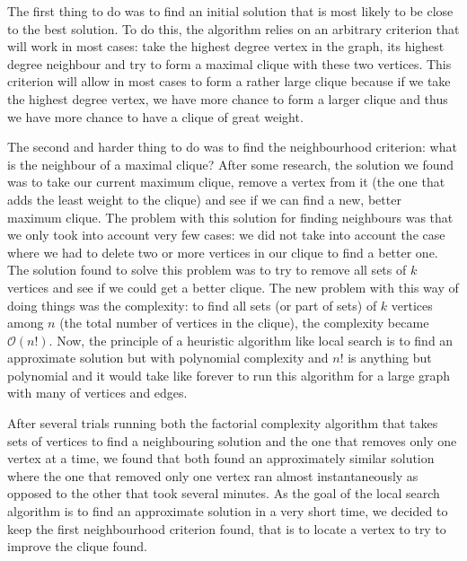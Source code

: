 The first thing to do was to find an initial solution that is most likely to be 
close to the best solution. To do this, the algorithm relies on an arbitrary 
criterion that will work in most cases: take the highest degree vertex in the 
graph, its highest degree neighbour and try to form a maximal clique with these 
two vertices. This criterion will allow in most cases to form a rather large 
clique because if we take the highest degree vertex, we have more chance to form 
a larger clique and thus we have more chance to have a clique of great weight.
\bigskip

The second and harder thing to do was to find the neighbourhood criterion: what 
is the neighbour of a maximal clique? After some research, the solution we found 
was to take our current maximum clique, remove a vertex from it (the one that adds 
the least weight to the clique) and see if we can find a new, better maximum 
clique. The problem with this solution for finding neighbours was that we only 
took into account very few cases: we did not take into account the case where we 
had to delete two or more vertices in our clique to find a better one. The 
solution found to solve this problem was to try to remove all sets of $k$ vertices 
and see if we could get a better clique. The new problem with this way of doing 
things was the complexity: to find all sets (or part of sets) of $k$ vertices among 
$n$ (the total number of vertices in the clique), the complexity became $\mathcal{O}(n!)$. 
Now, the principle of a heuristic algorithm like local search is to find an approximate 
solution but with polynomial complexity and $n!$ is anything but polynomial and it 
would take like forever to run this algorithm for a large graph with many of vertices 
and edges.
\bigskip

After several trials running both the factorial complexity algorithm that takes 
sets of vertices to find a neighbouring solution and the one that removes only one 
vertex at a time, we found that both found an approximately similar solution where 
the one that removed only one vertex ran almost instantaneously as opposed to the 
other that took several minutes. As the goal of the local search algorithm is to 
find an approximate solution in a very short time, we decided to keep the first 
neighbourhood criterion found, that is to locate a vertex to try to improve the 
clique found.